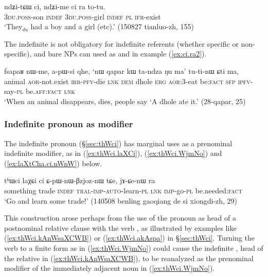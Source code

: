 \begin{exe}
\ex \label{ex:ci.ra}
 \gll  ndʑi-tɕɯ ci, ndʑi-me ci ra to-tu. \\
 \textsc{3du}.\textsc{poss}-son \textsc{indef}  \textsc{3du}.\textsc{poss}-girl \textsc{indef} \textsc{pl} \textsc{ifr}-exist \\
 \glt  `They$_{du}$ had a boy and a girl (etc).' (150827 tianluo-zh, 155)
\end{exe}

 The indefinite  is not obligatory for indefinite referents (whether specific or non-specific), and bare NPs can used as  and  in example (\ref{ex:ci.ra2}).
 

\begin{exe}
\ex \label{ex:ci.ra2}
 \gll  fsapaʁ nɯ-me, a-pɯ-si qhe, `nɯ qapar kɯ ta-ndza ŋu ma' tu-ti-nɯ ɕti ma, \\
 animal \textsc{aor}-not.exist \textsc{irr}-\textsc{pfv}-die \textsc{lnk} \textsc{dem} dhole \textsc{erg} \textsc{aor}:3\flobv{}-eat be:\textsc{fact} \textsc{sfp} \textsc{ipfv}-say-\textsc{pl} be.\textsc{aff}:\textsc{fact} \textsc{lnk}  \\
 \glt `When an animal disappears, dies, people say `A dhole ate it.' (28-qapar, 25)
\end{exe}


\subsubsection{Indefinite pronoun as modifier} \label{sec:indefinite}
The indefinite pronoun  (§\ref{sec:thWci}) has marginal uses as a prenominal indefinite modifier, as in  (\ref{ex:thWci.laXCi}), (\ref{ex:thWci.WjmNo}) and (\ref{ex:laXtCha.ci.nWnW}) below. 

\begin{exe}
\ex \label{ex:thWci.laXCi}
\gll   tʰɯci laχɕi ci ɕ-pɯ-nɯ-βzjoz-nɯ tɕe, jɤ-ɕe-nɯ ra \\
something trade \textsc{indef} \textsc{tral}-\textsc{imp}-\textsc{auto}-learn-\textsc{pl} \textsc{lnk} \textsc{imp}-go-\textsc{pl} be.needed:\textsc{fact} \\
\glt `Go and learn some trade!' (140508 benling gaoqiang de si xiongdi-zh, 29)
 \end{exe}
 
 This construction arose perhaps from the use of the pronoun  as head of a postnominal relative clause with the verb , as illustrated by examples like (\ref{ex:thWci.kAnWsaXCWB}) or (\ref{ex:thWci.akAspa}) in §\ref{sec:thWci}. Turning the verb  to a finite form as in (\ref{ex:thWci.WjmNo}) could cause the indefinite , head of the relative in (\ref{ex:thWci.kAnWsaXCWB}), to be reanalyzed as the prenominal modifier of the immediately adjacent noun in (\ref{ex:thWci.WjmNo}).


